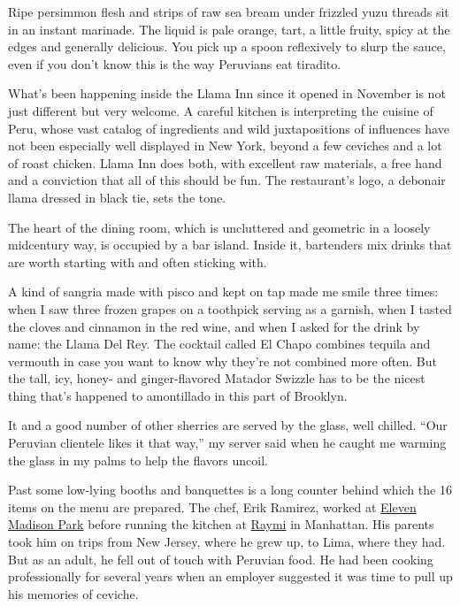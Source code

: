 Ripe persimmon flesh and strips of raw sea bream under frizzled yuzu
threads sit in an instant marinade. The liquid is pale orange, tart, a
little fruity, spicy at the edges and generally delicious. You pick up a
spoon reflexively to slurp the sauce, even if you don't know this is the
way Peruvians eat tiradito.

What's been happening inside the Llama Inn since it opened in November
is not just different but very welcome. A careful kitchen is
interpreting the cuisine of Peru, whose vast catalog of ingredients and
wild juxtapositions of influences have not been especially well
displayed in New York, beyond a few ceviches and a lot of roast chicken.
Llama Inn does both, with excellent raw materials, a free hand and a
conviction that all of this should be fun. The restaurant's logo, a
debonair llama dressed in black tie, sets the tone.

The heart of the dining room, which is uncluttered and geometric in a
loosely midcentury way, is occupied by a bar island. Inside it,
bartenders mix drinks that are worth starting with and often sticking
with.

A kind of sangria made with pisco and kept on tap made me smile three
times: when I saw three frozen grapes on a toothpick serving as a
garnish, when I tasted the cloves and cinnamon in the red wine, and when
I asked for the drink by name: the Llama Del Rey. The cocktail called El
Chapo combines tequila and vermouth in case you want to know why they're
not combined more often. But the tall, icy, honey- and ginger-flavored
Matador Swizzle has to be the nicest thing that's happened to
amontillado in this part of Brooklyn.

It and a good number of other sherries are served by the glass, well
chilled. ``Our Peruvian clientele likes it that way,'' my server said
when he caught me warming the glass in my palms to help the flavors
uncoil.

Past some low-lying booths and banquettes is a long counter behind which
the 16 items on the menu are prepared. The chef, Erik Ramirez, worked at
\href{http://www.nytimes3xbfgragh.onion/2015/03/18/dining/restaurant-review-eleven-madison-park-in-midtown-south.html}{Eleven
Madison Park} before running the kitchen at
\href{http://www.rayminyc.com/}{Raymi} in Manhattan. His parents took
him on trips from New Jersey, where he grew up, to Lima, where they had.
But as an adult, he fell out of touch with Peruvian food. He had been
cooking professionally for several years when an employer suggested it
was time to pull up his memories of ceviche.

